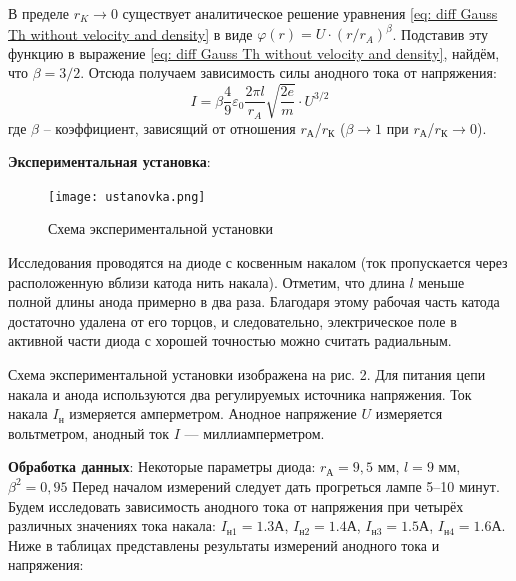 \documentclass[a4paper,12pt]{article}
\begin{document}
В пределе $r_K \rightarrow 0$ существует аналитическое решение уравнения \eqref{eq: diff Gauss Th without velocity and density} в виде $\varphi (r) = U\cdot {(r/r_A)}^{\beta}$. Подставив эту функцию в выражение \eqref{eq: diff Gauss Th without velocity and density}, найдём, что $\beta = 3/2$. Отсюда получаем зависимость силы анодного тока от напряжения:\
\begin{equation}\label{eq: I(U)}
    I = \beta \frac{4}{9}\varepsilon_0\frac{2\pi l}{r_A}\sqrt{\frac{2e}{m}}\cdot U^{3/2}
 \end{equation}
где $\beta$ -- коэффициент, зависящий от отношения $r_А$/$r_К$ ($\beta \rightarrow 1$ при $r_А$/$r_К \rightarrow 0$).

\textbf{Экспериментальная установка}: 
\begin{figure}[H]\label{fig: ustanovka}
    \centering
    \texttt{[image: ustanovka.png]}
    \caption{Схема экспериментальной установки}
\end{figure}

Исследования проводятся на диоде с косвенным накалом (ток пропускается через расположенную вблизи катода нить накала). Отметим, что длина $l$ меньше полной длины анода примерно в два раза. Благодаря этому рабочая часть катода достаточно удалена от его торцов, и следовательно, электрическое поле в активной части диода с хорошей точностью можно считать радиальным.

Схема экспериментальной установки изображена на рис. 2. Для питания цепи накала и анода используются два регулируемых источника напряжения. Ток накала $I_н$ измеряется амперметром. Анодное напряжение $U$ измеряется вольтметром, анодный ток $I$ — миллиамперметром.
\newpage

\textbf{Обработка данных}: Некоторые параметры диода: $r_А = 9,5$ мм, $l = 9$ мм, 
$\beta^2 = 0,95$ Перед началом измерений следует дать прогреться лампе 5--10 минут. Будем исследовать зависимость анодного тока от напряжения при четырёх различных значениях тока накала: $I_{н1} = 1.3 А$, $I_{н2} = 1.4 А$, $I_{н3} = 1.5 А$, $I_{н4} = 1.6 А$. Ниже в таблицах представлены результаты измерений анодного тока и напряжения:
\end{document}

